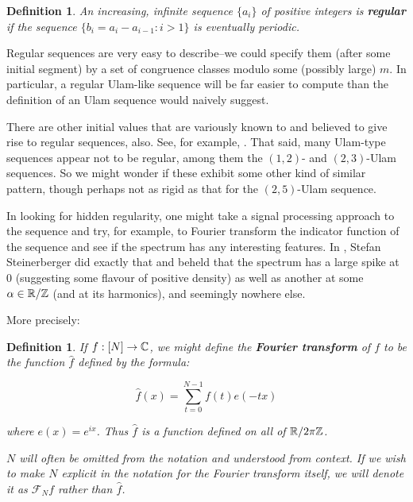 \documentclass{report}
\newtheorem{definition}[theorem]{Definition}
\theoremstyle{remark}
\numberwithin{equation}{section}
\begin{document}
\begin{definition}\label{def:regularity}
  An increasing, infinite sequence $\{a_i\}$ of positive integers is
  \textbf{regular} if the sequence $\{b_i = a_i - a_{i-1} : i > 1\}$
  is eventually periodic.
\end{definition}

Regular sequences are very easy to describe--we could specify them
(after some initial segment) by a set of congruence classes modulo
some (possibly large) $m$.  In particular, a regular Ulam-like
sequence will be far easier to compute than the definition of an Ulam
sequence would naively suggest.

There are other initial values that are variously known to and
believed to give rise to regular sequences, also.  See, for example,
\cite{finch:em1992}.  That said, many Ulam-type sequences appear not
to be regular, among them the $(1,2)$- and $(2,3)$-Ulam sequences.  So
we might wonder if these exhibit some other kind of similar pattern,
though perhaps not as rigid as that for the $(2,5)$-Ulam sequence.  

In looking for hidden regularity, one might take a signal processing
approach to the sequence and try, for example, to Fourier transform
the indicator function of the sequence and see if the spectrum has any
interesting features.  In \cite{steinerberger:preprint}, Stefan
Steinerberger did exactly that and beheld that the spectrum has a
large spike at 0 (suggesting some flavour of positive density) as well
as another at some $\alpha \in \mathbb{R}/\mathbb{Z}$ (and at its harmonics), and
seemingly nowhere else.

More precisely: 

\begin{definition} If $f : [N] \to \mathbb{C}$, we might define the
  \textbf{Fourier transform} of $f$ to be the function $\widehat{f}$
  defined by the formula:

  \[\widehat{f}(x) = \sum_{t=0}^{N-1} f(t) e(-tx)\]

  where $e(x) = e^{i x}$.  Thus $\widehat{f}$ is a function defined on
  all of $\mathbb{R}/2\pi\mathbb{Z}$.

  $N$ will often be omitted from the notation and understood from
  context.  If we wish to make $N$ explicit in the notation for the
  Fourier transform itself, we will denote it as $\mathcal{F}_N f$
  rather than $\widehat{f}$.
\end{definition}
\end{document}
